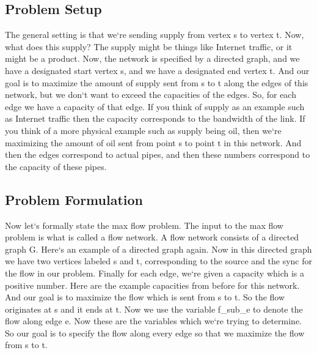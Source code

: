 \subsection{Problem Setup}
The general setting is that we`re sending supply from vertex s to vertex t.
Now, what does this supply? The supply might be things like Internet traffic, or it might be a product.
Now, the network is specified by a directed graph, and we have a designated start vertex s, and we have a designated end vertex t.
And our goal is to maximize the amount of supply sent from s to t along the edges of this network, but we don`t want to exceed the capacities of the edges.
So, for each edge we have a capacity of that edge.
If you think of supply as an example such as Internet traffic then the capacity corresponds to the bandwidth of the link.
If you think of a more physical example such as supply being oil, then we`re maximizing the amount of oil sent from point s to point t in this network.
And then the edges correspond to actual pipes, and then these numbers correspond to the capacity of these pipes.

\subsection{Problem Formulation}
Now let`s formally state the max flow problem.
The input to the max flow problem is what is called a flow network.
A flow network consists of a directed graph G\@.
Here`s an example of a directed graph again.
Now in this directed graph we have two vertices labeled s and t, corresponding to the source and the sync for the flow in our problem.
Finally for each edge, we`re given a capacity which is a positive number.
Here are the example capacities from before for this network.
And our goal is to maximize the flow which is sent from s to t.
So the flow originates at s and it ends at t.
Now we use the variable f\_sub\_e to denote the flow along edge e.
Now these are the variables which we`re trying to determine.
So our goal is to specify the flow along every edge so that we maximize the flow from s to t.

